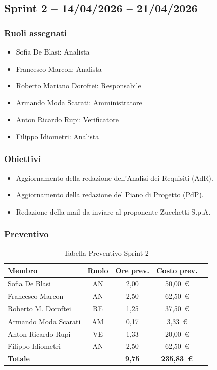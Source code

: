 \subsection{Sprint 2 -- 14/04/2026 -- 21/04/2026}
\label{sec:sprint2}

\subsubsection{Ruoli assegnati}
\begin{itemize}
    \item Sofia De Blasi: Analista
    \item Francesco Marcon: Analista
    \item Roberto Mariano Doroftei: Responsabile
    \item Armando Moda Scarati: Amministratore
    \item Anton Ricardo Rupi: Verificatore 
    \item Filippo Idiometri: Analista
\end{itemize}

\subsubsection{Obiettivi}
\begin{itemize}
    \item Aggiornamento della redazione dell'Analisi dei Requisiti (AdR).
    \item Aggiornamento della redazione del Piano di Progetto (PdP).
    \item Redazione della mail da inviare al proponente Zucchetti S.p.A.
\end{itemize}

\subsubsection{Preventivo}
\begin{table}[H]
    \centering
    \renewcommand{\arraystretch}{1.3}
    \begin{tabularx}{\textwidth}{|X|c|c|c|r|}
        \hline
        \textbf{Membro} & \textbf{Ruolo} & \textbf{Ore prev.} & \textbf{Costo prev.} \\
        \hline
        Sofia De Blasi           & AN & 2,00 & 50{,}00~\euro \\
        Francesco Marcon         & AN & 2,50 & 62{,}50~\euro \\
        Roberto M. Doroftei      & RE & 1,25 & 37{,}50~\euro \\
        Armando Moda Scarati     & AM & 0,17 & 3{,}33~\euro \\
        Anton Ricardo Rupi       & VE & 1,33 & 20{,}00~\euro \\
        Filippo Idiometri        & AN & 2,50 & 62{,}50~\euro \\
        \hline
        \textbf{Totale}          &    & \textbf{9,75} &
        \textbf{235{,}83~\euro} \\
        \hline
    \end{tabularx}
    \caption{Tabella Preventivo Sprint 2} 
\end{table}

